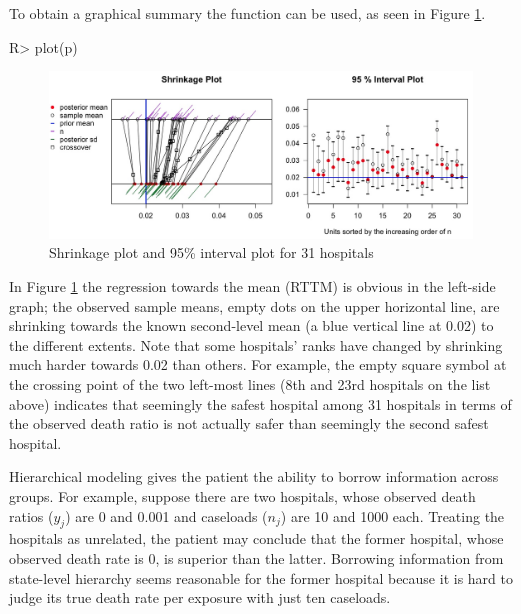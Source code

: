 \documentclass[article]{jss}
\begin{document}
To obtain a graphical summary the function  can be used, as seen in Figure \ref{fig:hospshr}.

\begin{CodeChunk}
\begin{CodeInput}
R> plot(p)
\end{CodeInput}
\end{CodeChunk}
\begin{figure}[h]
\begin{center}
\includegraphics[scale=0.25]{hospital1.png}
\caption{Shrinkage plot and 95\% interval plot for 31 hospitals}
\label{fig:hospshr}
\end{center}
\end{figure}

In Figure \ref{fig:hospshr} the regression towards the mean (RTTM) is obvious in the left-side graph; the observed sample means, empty dots on the upper horizontal line, are shrinking towards the known second-level mean (a blue vertical line at 0.02) to the different extents. Note that some hospitals' ranks have changed by shrinking much harder towards 0.02 than others. For example, the empty square symbol at the crossing point of the two left-most lines (8th and 23rd hospitals on the list above) indicates that seemingly the safest hospital among 31 hospitals in terms of the observed death ratio is not actually safer than seemingly the second safest hospital. 


Hierarchical modeling gives the patient the ability to borrow information across groups. For example, suppose there are two hospitals, whose observed death ratios ($y_{j}$) are 0 and 0.001 and caseloads ($n_{j}$) are 10 and 1000 each. Treating the hospitals as unrelated, the patient may conclude that the former hospital, whose observed death rate is 0, is superior than the latter. Borrowing information from state-level hierarchy seems reasonable for the former hospital because it is hard to judge its true death rate per exposure with just ten caseloads.
\end{document}
